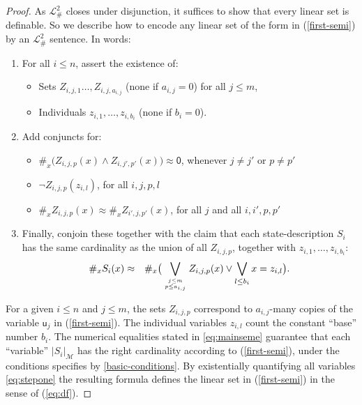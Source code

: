 \documentclass[12pt,oneside,reqno]{amsart}
\theoremstyle{definition}
\begin{document}
\begin{proof} As $\mathcal{L}_\#^2$ closes under disjunction, it suffices to show that every linear set is definable. So we describe how to encode any linear set of the form in (\ref{first-semi}) by an $\mathcal{L}_\#^2$ sentence.  In words: \begin{enumerate}[label=(\roman*)]
    \item \label{eq:stepone} For all $i\leq n$, assert the existence of:\vspace{0.5mm} \begin{itemize} %
    \item Sets $Z_{i,j,1} \dots, Z_{i,j,a_{i,j}}$ (none if $a_{i,j}=0$) for all $j \leq m$,\vspace{0.5mm}
    \item Individuals $z_{i,1}, \dots, z_{i,b_i}$ (none if $b_i=0$). \end{itemize}\vspace{1mm}
    \item Add conjuncts for:\vspace{0.5mm} \begin{itemize} \item  $\#_x\big(Z_{i,j,p}(x) \wedge Z_{i,j',p'}(x)\big) \approx \mathsf{0}$, whenever $j\neq j'$ or $p \neq p'$\vspace{0.5mm} \item \label{basic-conditions} $\neg Z_{i,j,p}(z_{i,l})$, for all $i,j,p,l$\vspace{0.5mm}
    \item $\#_xZ_{i,j,p}(x) \approx \#_xZ_{i',j,p'}(x)$, for all $j$ and all $i,i',p,p'$ \end{itemize}\vspace{1mm}
    \item \label{eq:mainseme} Finally, conjoin these together with the claim that each state-description $S_i$ has the same cardinality as the union of all $Z_{i,j,p}$, together with $z_{i,1},\dots,z_{i,b_i}$: \begin{eqnarray*}\#_xS_i(x) & \approx & \#_x \big( \bigvee_{j\leq m \atop p \leq a_{i,j}} Z_{i,j,p}(x) \vee \bigvee_{l \leq b_i} x = z_{i,l}  \big).
    \end{eqnarray*} 
\end{enumerate} For a given $i\leq n$ and $j \leq m$, the sets $Z_{i,j,p}$ correspond to $a_{i,j}$-many  copies of the variable $\mathsf{u}_j$ in (\ref{first-semi}). The individual variables $z_{i,l}$ count the constant ``base'' number $b_i$. The numerical equalities stated in \ref{eq:mainseme} guarantee that each ``variable'' $|S_i|_\mathcal{M}$ has the right cardinality according to (\ref{first-semi}), under the conditions specifies by \ref{basic-conditions}. By existentially quantifying all variables \ref{eq:stepone} the resulting formula defines the linear set in (\ref{first-semi}) in the sense of (\ref{eq:df}). 
\end{proof}
\end{document}
